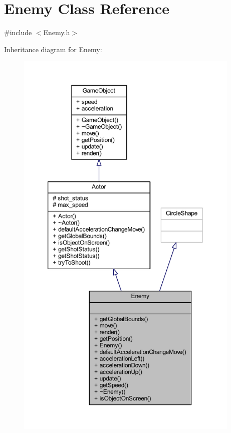 \hypertarget{class_enemy}{}\section{Enemy Class Reference}
\label{class_enemy}


{\ttfamily \#include $<$Enemy.\+h$>$}



Inheritance diagram for Enemy\+:\nopagebreak
\begin{figure}[H]
\begin{center}
\leavevmode
\includegraphics[height=550pt]{class_enemy__inherit__graph}
\end{center}
\end{figure}


